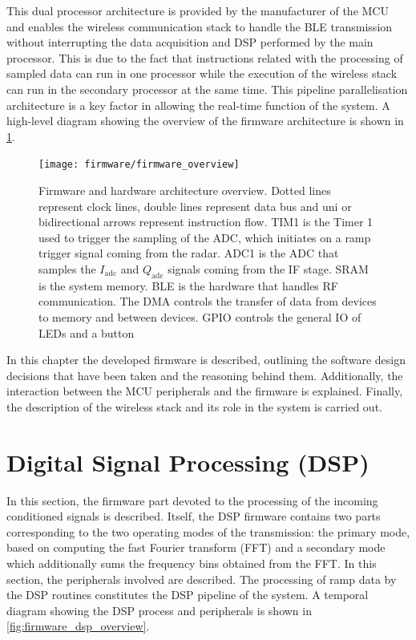 This dual processor architecture is provided by the manufacturer of the MCU and enables the wireless communication stack to handle the BLE transmission without interrupting the data acquisition and DSP performed by the main processor. This is due to the fact that instructions related with the processing of sampled data can run in one processor while the execution of the wireless stack can run in the secondary processor at the same time. This pipeline parallelisation architecture is a key factor in allowing the real-time function of the system. A high-level diagram showing the overview of the firmware architecture is shown in \cref{fig:firmware_overview}.

\begin{figure}[ht]
	\centering
	\texttt{[image: firmware/firmware\_overview]}
	\caption{Firmware and hardware architecture overview. Dotted lines represent clock lines, double lines represent data bus and uni or bidirectional arrows represent instruction flow. TIM1 is the Timer 1 used to trigger the sampling of the ADC, which initiates on a ramp trigger signal coming from the radar. ADC1 is the ADC that samples the $I_{\mathrm{adc}}$ and $Q_{\mathrm{adc}}$ signals coming from the IF stage. SRAM is the system memory. BLE is the hardware that handles RF communication. The DMA controls the transfer of data from devices to memory and between devices. GPIO controls the general IO of LEDs and a button}
	\label{fig:firmware_overview}
\end{figure}

In this chapter the developed firmware is described, outlining the software design decisions that have been taken and the reasoning behind them. Additionally, the interaction between the MCU peripherals and the firmware is explained. Finally, the description of the wireless stack and its role in the system is carried out.

\section{Digital Signal Processing (DSP)}

In this section, the firmware part devoted to the processing of the incoming conditioned signals is described. Itself, the DSP firmware contains two parts corresponding to the two operating modes of the transmission: the primary mode, based on computing the fast Fourier transform (FFT) and a secondary mode which additionally sums the frequency bins obtained from the FFT. In this section, the peripherals involved are described. The processing of ramp data by the DSP routines constitutes the DSP pipeline of the system. A temporal diagram showing the DSP process and peripherals is shown in \cref{fig:firmware_dsp_overview}.

